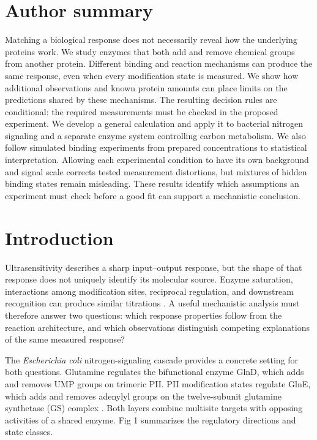 \documentclass[10pt,letterpaper]{article}
\begin{document}
\section*{Author summary}

Matching a biological response does not necessarily reveal how the underlying proteins work. We study enzymes that both add and remove chemical groups from another protein. Different binding and reaction mechanisms can produce the same response, even when every modification state is measured. We show how additional observations and known protein amounts can place limits on the predictions shared by these mechanisms. The resulting decision rules are conditional: the required measurements must be checked in the proposed experiment. We develop a general calculation and apply it to bacterial nitrogen signaling and a separate enzyme system controlling carbon metabolism. We also follow simulated binding experiments from prepared concentrations to statistical interpretation. Allowing each experimental condition to have its own background and signal scale corrects tested measurement distortions, but mixtures of hidden binding states remain misleading. These results identify which assumptions an experiment must check before a good fit can support a mechanistic conclusion.

\clearpage
{}

\section*{Introduction}

Ultrasensitivity describes a sharp input--output response, but the shape of that response does not uniquely identify its molecular source. Enzyme saturation, interactions among modification sites, reciprocal regulation, and downstream recognition can produce similar titrations \cite{r1,r2}. A useful mechanistic analysis must therefore answer two questions: which response properties follow from the reaction architecture, and which observations distinguish competing explanations of the same measured response?

The \textit{Escherichia coli} nitrogen-signaling cascade provides a concrete setting for both questions. Glutamine regulates the bifunctional enzyme GlnD, which adds and removes UMP groups on trimeric PII. PII modification states regulate GlnE, which adds and removes adenylyl groups on the twelve-subunit glutamine synthetase (GS) complex \cite{r5,r6,r7}. Both layers combine multisite targets with opposing activities of a shared enzyme. Fig 1 summarizes the regulatory directions and state classes.
\end{document}
